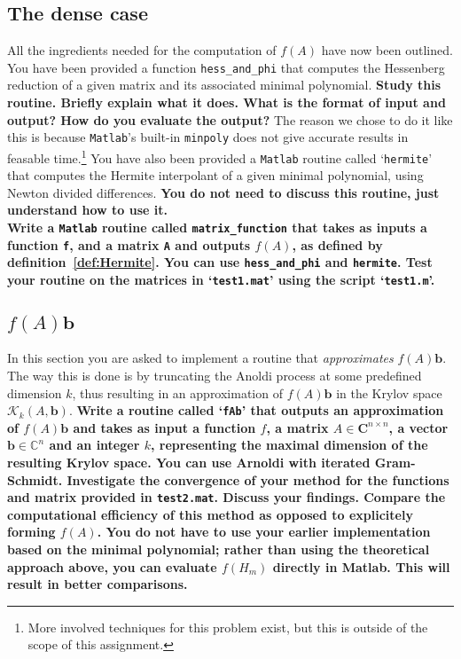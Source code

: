 \documentclass[12pt]{article}
\begin{document}
\subsection{The dense case}
All the ingredients needed for the computation of $f(A)$ have now been outlined. You have been provided a function \texttt{hess\_and\_phi} that computes the Hessenberg reduction of a given matrix and its associated minimal polynomial. \textbf{Study this routine. Briefly explain what it does. What is the format of input and output? How do you evaluate the output?} The reason we chose to do it like this is because \texttt{Matlab}'s built-in \texttt{minpoly} does not give accurate results in feasable time.\footnote{More involved techniques for this problem exist, but this is outside of the scope of this assignment.} You have also been provided a \texttt{Matlab} routine called `\texttt{hermite}' that computes the Hermite interpolant of a given minimal polynomial, using Newton divided differences. \textbf{You do not need to discuss this routine, just understand how to use it.}\\
\textbf{Write a \texttt{Matlab} routine called \texttt{matrix\_function} that takes as inputs a function \texttt{f}, and a matrix \texttt{A} and outputs $f(A)$, as defined by definition~\ref{def:Hermite}. You can use \texttt{hess\_and\_phi} and \texttt{hermite}. Test your routine on the matrices in `\texttt{test1.mat}' using the script `\texttt{test1.m}'.}
\subsection{$f(A)\mathbf{b}$}
In this section you are asked to implement a routine that \emph{approximates} $f(A)\mathbf{b}$. The way this is done is by truncating the Anoldi process at some predefined dimension $k$, thus resulting in an approximation of $f(A)\mathbf{b}$ in the Krylov space $\mathcal{K}_k(A,\mathbf{b})$.
\textbf{Write a routine called `\texttt{fAb}' that outputs an approximation of $f(A)\mathbf{b}$ and takes as input a function $f$, a matrix $A\in \mathbf{C}^{n\times n}$, a vector $\mathbf{b}\in\mathbb{C}^n$ and an integer $k$, representing the maximal dimension of the resulting Krylov space. You can use Arnoldi with iterated Gram-Schmidt. Investigate the convergence of your method for the functions and matrix provided in \texttt{test2.mat}. Discuss your findings. Compare the computational efficiency of this method as opposed to explicitely forming $f(A)$. You do not have to use your earlier implementation based on the minimal polynomial; rather than using the theoretical approach above, you can evaluate $f(H_m)$ directly in Matlab. This will result in better comparisons.}
\end{document}
